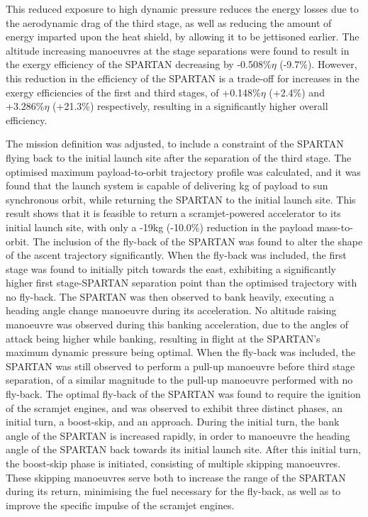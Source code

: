 This reduced exposure to high dynamic pressure reduces the energy losses due to the aerodynamic drag of the third stage, as well as reducing the amount of energy imparted upon the heat shield, by allowing it to be jettisoned earlier. 
The altitude increasing manoeuvres at the stage separations were found to result in the exergy efficiency of the SPARTAN decreasing by -0.508\%$\eta$ (-9.7\%). However, this reduction in the efficiency of the SPARTAN is a trade-off for increases in the exergy efficiencies of the first and third stages, of +0.148\%$\eta$ (+2.4\%) and +3.286\%$\eta$ (+21.3\%) respectively, resulting in a significantly higher overall efficiency.


The mission definition was adjusted, to include a constraint of the SPARTAN flying back to the initial launch site after the separation of the third stage. 
The optimised maximum payload-to-orbit trajectory profile was calculated, and it was found that the launch system is capable of delivering \PayloadToOrbitStandard kg of payload to sun synchronous orbit, while returning the SPARTAN to the initial launch site. This result shows that it is feasible to return a scramjet-powered accelerator to its initial launch site, with only a -19kg (-10.0\%) reduction in the payload mass-to-orbit.
	The inclusion of the fly-back of the SPARTAN was found to alter the shape of the ascent trajectory significantly. When the fly-back was included, the first stage was found to initially pitch towards the east, exhibiting a significantly higher first stage-SPARTAN separation point than the optimised trajectory with no fly-back. The SPARTAN was then observed to bank heavily, executing a heading angle change manoeuvre during its acceleration. No altitude raising manoeuvre was observed during this banking acceleration, due to the angles of attack being higher while banking, resulting in flight at the SPARTAN's maximum dynamic pressure being optimal. 
When the fly-back was included, the SPARTAN was still observed to perform a pull-up manoeuvre before third stage separation, of a similar magnitude to the pull-up manoeuvre performed with no fly-back. 
The optimal fly-back of the SPARTAN was found to require the ignition of the scramjet engines, and was observed to exhibit three distinct phases, an initial turn, a boost-skip, and an approach. 
During the initial turn, the bank angle of the SPARTAN is increased rapidly, in order to manoeuvre the heading angle of the SPARTAN back towards its initial launch site. 
After this initial turn, the boost-skip phase is initiated, consisting of multiple skipping manoeuvres. These skipping manoeuvres serve both to increase the range of the SPARTAN during its return, minimising the fuel necessary for the fly-back, as well as to improve the specific impulse of the scramjet engines.
